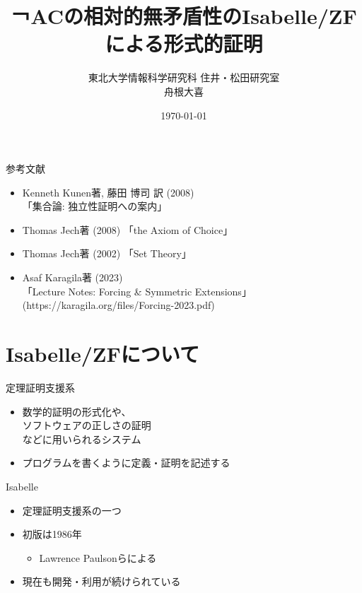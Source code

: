 \documentclass[17pt,aspectratio=169]{beamer}
\title{￢ACの相対的無矛盾性のIsabelle/ZFによる形式的証明}
\author{東北大学情報科学研究科 住井・松田研究室 \\ 舟根大喜}
\date{\today}
\begin{document}
\maketitle

\begin{frame} {参考文献}
    \begin{itemize}
        \item Kenneth Kunen著, 藤田 博司 訳 (2008) \\「集合論: 独立性証明への案内」
        \item Thomas Jech著 (2008) 「the Axiom of Choice」
        \item Thomas Jech著 (2002) 「Set Theory」
        \item Asaf Karagila著 (2023) \\ 「Lecture Notes: Forcing \& Symmetric Extensions」 \\
              {\small (https://karagila.org/files/Forcing-2023.pdf) }
    \end{itemize}
\end{frame}

\section{Isabelle/ZFについて}

\begin{frame}{定理証明支援系}
    \begin{itemize}
        \item 数学的証明の形式化や、\\ソフトウェアの正しさの証明\\などに用いられるシステム
        \item プログラムを書くように定義・証明を記述する
    \end{itemize}


\end{frame}

\begin{frame}{Isabelle}
    \begin{itemize}
        \item 定理証明支援系の一つ
        \item 初版は1986年
              {\small \begin{itemize}
                  \item Lawrence Paulsonらによる
              \end{itemize} }
        \item 現在も開発・利用が続けられている
    \end{itemize}


\end{frame}
\end{document}
